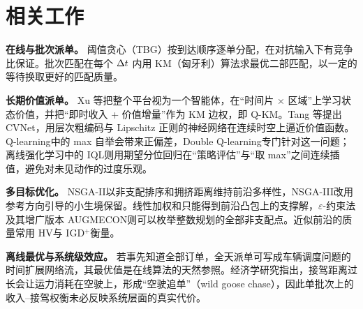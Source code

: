 \section{相关工作}

\textbf{在线与批次派单。} 阈值贪心（TBG）按到达顺序逐单分配，在对抗输入下有竞争比保证\cite{tong2016online}。批次匹配在每个 $\Delta t$ 内用 KM（匈牙利）算法\cite{kuhn1955hungarian}求最优二部匹配，以一定的等待换取更好的匹配质量。

\textbf{长期价值派单。} Xu 等\cite{xu2018large}把整个平台视为一个智能体，在“时间片 × 区域”上学习状态价值，并把“即时收入 + 价值增量”作为 KM 边权，即 Q-KM。Tang 等\cite{tang2019deep}提出 CVNet，用层次粗编码与 Lipschitz 正则的神经网络在连续时空上逼近价值函数。Q-learning\cite{watkins1992q}中的 max 自举会带来正偏差，Double Q-learning\cite{hasselt2010double}专门针对这一问题；离线强化学习中的 IQL\cite{kostrikov2022offline}则用期望分位回归\cite{newey1987asymmetric}在“策略评估”与“取 max”之间连续插值，避免对未见动作的过度乐观。

\textbf{多目标优化。} NSGA-II\cite{deb2002fast}以非支配排序和拥挤距离维持前沿多样性，NSGA-III\cite{deb2014evolutionary}改用参考方向引导的小生境保留。线性加权和只能得到前沿凸包上的支撑解，$\varepsilon$-约束法\cite{haimes1971bicriterion}及其增广版本 AUGMECON\cite{mavrotas2009effective}则可以枚举整数规划的全部非支配点。近似前沿的质量常用 HV\cite{zitzler1999multiobjective}与 IGD$^+$\cite{ishibuchi2015modified}衡量。

\textbf{离线最优与系统级效应。} 若事先知道全部订单，全天派单可写成车辆调度问题的时间扩展网络流\cite{bunte2009overview}，其最优值是在线算法的天然参照。经济学研究指出，接驾距离过长会让运力消耗在空驶上，形成“空驶追单”（wild goose chase）\cite{castillo2017surge}，因此单批次上的收入–接驾权衡未必反映系统层面的真实代价。
